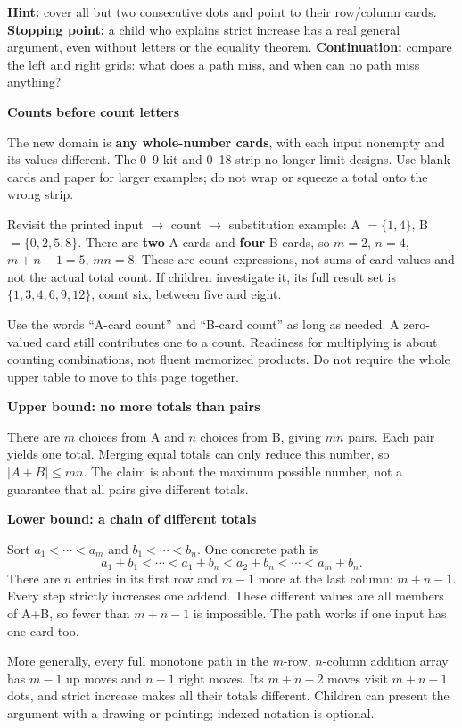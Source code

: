 \documentclass[11pt]{article}
\newcommand{\heading}[1]{\vspace{4pt}{\large\bfseries #1}\par}
\newcommand{\sub}[1]{\textbf{#1}\par}
\newcommand{\sset}[1]{\{#1\}}
\begin{document}
\textbf{Hint:} cover all but two consecutive dots and point to their row/column cards. \textbf{Stopping point:} a child who explains strict increase has a real general argument, even without letters or the equality theorem. \textbf{Continuation:} compare the left and right grids: what does a path miss, and when can no path miss anything?
\newpage

\heading{Problem 9: sharp bounds for every size}
\sub{Counts before count letters}
The new domain is \textbf{any whole-number cards}, with each input nonempty and its values different. The 0--9 kit and 0--18 strip no longer limit designs. Use blank cards and paper for larger examples; do not wrap or squeeze a total onto the wrong strip.

Revisit the printed input $\to$ count $\to$ substitution example: A $=\sset{1,4}$, B $=\sset{0,2,5,8}$. There are \textbf{two} A cards and \textbf{four} B cards, so $m=2$, $n=4$, $m+n-1=5$, $mn=8$. These are count expressions, not sums of card values and not the actual total count. If children investigate it, its full result set is $\sset{1,3,4,6,9,12}$, count six, between five and eight.

Use the words ``A-card count'' and ``B-card count'' as long as needed. A zero-valued card still contributes one to a count. Readiness for multiplying is about counting combinations, not fluent memorized products. Do not require the whole upper table to move to this page together.

\sub{Upper bound: no more totals than pairs}
There are $m$ choices from A and $n$ choices from B, giving $mn$ pairs. Each pair yields one total. Merging equal totals can only reduce this number, so $|A+B|\leq mn$. The claim is about the maximum possible number, not a guarantee that all pairs give different totals.

\sub{Lower bound: a chain of different totals}
Sort $a_1<\cdots<a_m$ and $b_1<\cdots<b_n$. One concrete path is
\[
 a_1+b_1<\cdots<a_1+b_n<a_2+b_n<\cdots<a_m+b_n.
\]
There are $n$ entries in its first row and $m-1$ more at the last column: $m+n-1$. Every step strictly increases one addend. These different values are all members of A+B, so fewer than $m+n-1$ is impossible. The path works if one input has one card too.

More generally, every full monotone path in the $m$-row, $n$-column addition array has $m-1$ up moves and $n-1$ right moves. Its $m+n-2$ moves visit $m+n-1$ dots, and strict increase makes all their totals different. Children can present the argument with a drawing or pointing; indexed notation is optional.
\end{document}
